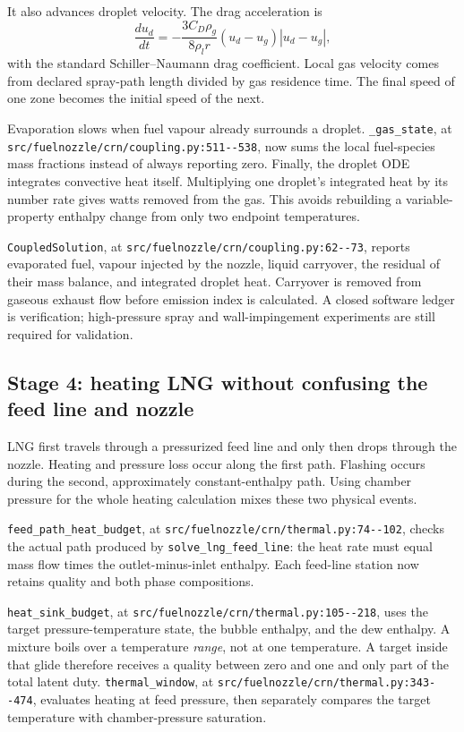 \documentclass[11pt]{article}
\newcommand{\code}[1]{\nolinkurl{#1}}
\newcommand{\srcline}[2]{\nolinkurl{#1:#2}}
\begin{document}
It also advances droplet velocity. The drag acceleration is
\[
 \frac{du_d}{dt}=-\frac{3C_D\rho_g}{8\rho_l r}
 (u_d-u_g)\left|u_d-u_g\right|,
\]
with the standard Schiller--Naumann drag coefficient. Local gas velocity comes from declared
spray-path length divided by gas residence time. The final speed of one zone becomes the
initial speed of the next.

Evaporation slows when fuel vapour already surrounds a droplet. \code{\_gas_state}, at
\srcline{src/fuelnozzle/crn/coupling.py}{511--538}, now sums the local fuel-species mass
fractions instead of always reporting zero. Finally, the droplet ODE integrates convective heat
itself. Multiplying one droplet's integrated heat by its number rate gives watts removed from
the gas. This avoids rebuilding a variable-property enthalpy change from only two endpoint
temperatures.

\code{CoupledSolution}, at
\srcline{src/fuelnozzle/crn/coupling.py}{62--73}, reports evaporated fuel, vapour injected by
the nozzle, liquid carryover, the residual of their mass balance, and integrated droplet heat.
Carryover is removed from gaseous exhaust flow before emission index is calculated. A closed
software ledger is verification; high-pressure spray and wall-impingement experiments are
still required for validation.

\subsection{Stage 4: heating LNG without confusing the feed line and nozzle}

LNG first travels through a pressurized feed line and only then drops through the nozzle.
Heating and pressure loss occur along the first path. Flashing occurs during the second,
approximately constant-enthalpy path. Using chamber pressure for the whole heating calculation
mixes these two physical events.

\code{feed_path_heat_budget}, at
\srcline{src/fuelnozzle/crn/thermal.py}{74--102}, checks the actual path produced by
\code{solve_lng_feed_line}: the heat rate must equal mass flow times the outlet-minus-inlet
enthalpy. Each feed-line station now retains quality and both phase compositions.

\code{heat_sink_budget}, at
\srcline{src/fuelnozzle/crn/thermal.py}{105--218}, uses the target pressure-temperature state,
the bubble enthalpy, and the dew enthalpy. A mixture boils over a temperature \emph{range}, not
at one temperature. A target inside that glide therefore receives a quality between zero and
one and only part of the total latent duty. \code{thermal_window}, at
\srcline{src/fuelnozzle/crn/thermal.py}{343--474}, evaluates heating at feed pressure, then
separately compares the target temperature with chamber-pressure saturation.
\end{document}
